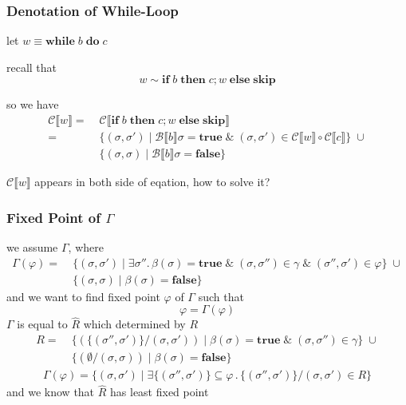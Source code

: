 \documentclass[12pt,aspectratio=169]{beamer}
\newcommand{\denoB}[1]{\mathcal{B} \llbracket #1 \rrbracket}
\newcommand{\denoC}[1]{\mathcal{C} \llbracket #1 \rrbracket}
\newcommand{\true}{\mathbf{true}}
\newcommand{\false}{\mathbf{false}}
\newcommand{\Skip}{\mathbf{skip}}
\newcommand{\ITE}[3]{\mathbf{if}\; #1 \; \mathbf{then} \; #2 \; \mathbf{else} \; #3}
\newcommand{\While}[2]{\mathbf{while}\; #1 \; \mathbf{do} \; #2}
\begin{document}
\begin{frame}
    \frametitle{Denotation of While-Loop}
    let $w \equiv \While{b}{c}$

    recall that
    \[
        w \sim \ITE{b}{c;w}{\Skip}
    \]

    so we have
    \begin{align*}
        \denoC{w} = & \; \denoC{\ITE{b}{c;w}{\Skip}}\\
            = & \; \{(\sigma, \sigma') \mid \denoB{b}\sigma = \true \; \& \; (\sigma, \sigma') \in \denoC{w} \circ \denoC{c}\} \; \cup \\
            & \; \{ (\sigma,\sigma) \mid \denoB{b}\sigma = \false \}
    \end{align*}

    $\denoC{w}$ appears in both side of eqation, how to solve it?
    
\end{frame}

\begin{frame}
    \frametitle{Fixed Point of $\Gamma$}
    we assume $\Gamma$, where
        \begin{align*}
            \Gamma(\varphi) %
                            = & \; \{(\sigma, \sigma') \mid \exists \sigma'' .\, \beta(\sigma) = \true \; \& \; (\sigma, \sigma'') \in \gamma \; \& \; (\sigma'', \sigma') \in \varphi\} \; \cup \\
                            & \; \{(\sigma,\sigma) \mid \beta(\sigma) = \false \}
        \end{align*}
    and we want to find fixed point $\varphi$ of $\Gamma$ such that
    \[
        \varphi = \Gamma(\varphi)
    \]
    $\Gamma$ is equal to $\widehat{R}$ which determined by $R$
    \begin{align*}
        R = & \; \{ (\{(\sigma'', \sigma')\} / (\sigma, \sigma')) \mid \beta(\sigma) = \true \; \& \; (\sigma, \sigma'') \in \gamma\}\; \cup \\
        & \; \{(\emptyset / (\sigma,\sigma)) \mid \beta(\sigma) = \false \}
    \end{align*}
    \begin{align*}
        \Gamma(\varphi) = \{(\sigma,\sigma') \mid \exists \{(\sigma'',\sigma')\} \subseteq \varphi \, . \, \{(\sigma'',\sigma')\} / (\sigma, \sigma') \in R \}
    \end{align*}
    and we know that $\widehat{R}$ has least fixed point
\end{frame}
\end{document}
